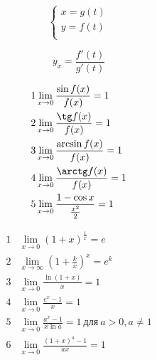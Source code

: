\documentclass{article}
\begin{document}
\begin{displaymath}
\left\{ \begin{array}{l}
          x = g(t)\\
          y = f(t)\\
\end{array} \right.
\end{displaymath}

\[ y_x = \frac{f'(t)}{g'(t)}\]


\begin{align*}
  1 &\lim_{x \to 0} \frac{\sin f(x)}{f(x)} = 1\\
  2 &\lim_{x \to 0} \frac{\tg f(x)}{f(x)} = 1\\
  3 &\lim_{x \to 0} \frac{\arcsin f(x)}{f(x)} = 1\\
  4 &\lim_{x \to 0} \frac{\arctg f(x)}{f(x)} = 1\\
  5 &\lim_{x \to 0} \frac{1 - \cos x}{\frac{x^2}{2}} = 1\\
\end{align*}



\begin{align*}
  1 &\lim_{x \to 0} (1+x)^{\frac{1}{x}} = e\\
  2 &\lim_{x \to \infty} ( 1 + \frac{k}{x} )^x  = e^k \\
  3 &\lim_{x \to 0} \frac{\ln (1 + x)}{x} = 1 \\
  4 &\lim_{x \to 0} \frac{e^x - 1}{x} = 1\\
  5 &\lim_{x \to 0} \frac{a^x - 1}{x\ln a} = 1 ~\text{для}~ a>0, a \not = 1\\
  6 &\lim_{x \to 0} \frac{(1 + x)^a - 1}{ax} = 1\\
\end{align*}


\end{document}
